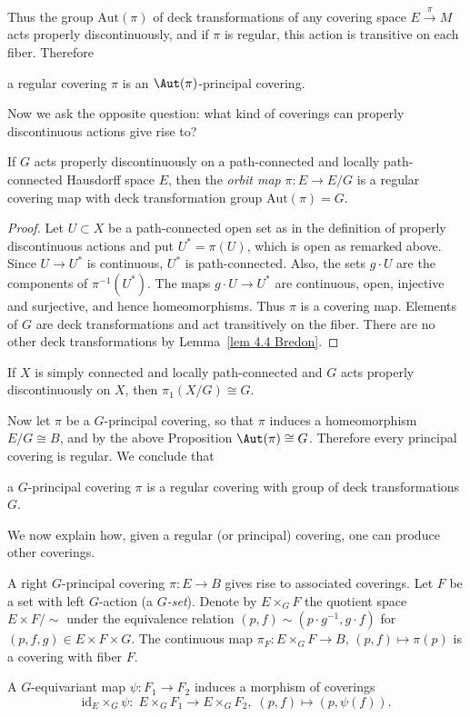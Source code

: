 Thus the group $\mathrm{Aut}(\pi)$ of deck transformations of any covering space $E\overset{\pi}{\to}M$ acts properly discontinuously, and if $\pi$ is regular, this action is transitive on each fiber. Therefore 
\begin{center}
    a regular covering $\pi$ is an $\Aut(\pi)$-principal covering.
\end{center}

Now we ask the opposite question: what kind of coverings can properly discontinuous actions give rise to?

\begin{prop}
    If $G$ acts properly discontinuously on a path-connected and locally path-connected Hausdorff space $E$, then the \emph{orbit map} $\pi:E\to E\slash G$ is a regular covering map with deck transformation group $\mathrm{Aut}(\pi)=G$.
\end{prop}
\begin{proof}
    Let $U\subset X$ be a path-connected open set as in the definition of properly discontinuous actions and put $U^\ast =\pi(U)$, which is open as remarked above. Since $U\to U^\ast$ is continuous, $U^\ast$ is path-connected. Also, the sets $g\cdot U$ are the components of $\pi^{-1}(U^\ast)$. The maps $g\cdot U\to U^\ast$ are continuous, open, injective and surjective, and hence homeomorphisms. Thus $\pi$ is a covering map. Elements of $G$ are deck transformations and act transitively on the fiber. There are no other deck transformations by Lemma~\ref{lem 4.4 Bredon}.
\end{proof}
\begin{cor}
    If $X$ is simply connected and locally path-connected and $G$ acts properly discontinuously on $X$, then $\pi_1(X\slash G)\cong G$.
\end{cor}


Now let $\pi$ be a $G$-principal covering, so that $\pi$ induces a homeomorphism $E\slash G\cong B$, and by the above Proposition $\Aut(\pi)\cong G$. Therefore every principal covering is regular. We conclude that 
\begin{center}
    a $G$-principal covering $\pi$ is a regular covering with group of deck transformations $G$.
\end{center}


We now explain how, given a regular (or principal) covering, one can produce other coverings.

\begin{defn}
    A right $G$-principal covering $\pi:E\to B$ gives rise to associated coverings. Let $F$ be a set with left $G$-action (a \emph{$G$-set}). Denote by $E\times_G F$ the quotient space $E\times F\slash \sim $ under the equivalence relation $(p,f)\sim(p\cdot g^{-1},g\cdot f)$ for $(p,f,g)\in E\times F\times G$. The continuous map $\pi_F:E\times_G F\to B$, $(p,f)\mapsto \pi(p)$ is a covering with fiber $F$.

    A $G$-equivariant map $\psi:F_1\to F_2$ induces a morphism of coverings
    \[\mathrm{id}_E\times_G\psi: \; E\times_G F_1\to E \times_G F_2,\; (p,f)\mapsto (p,\psi(f)).\]
\end{defn}


